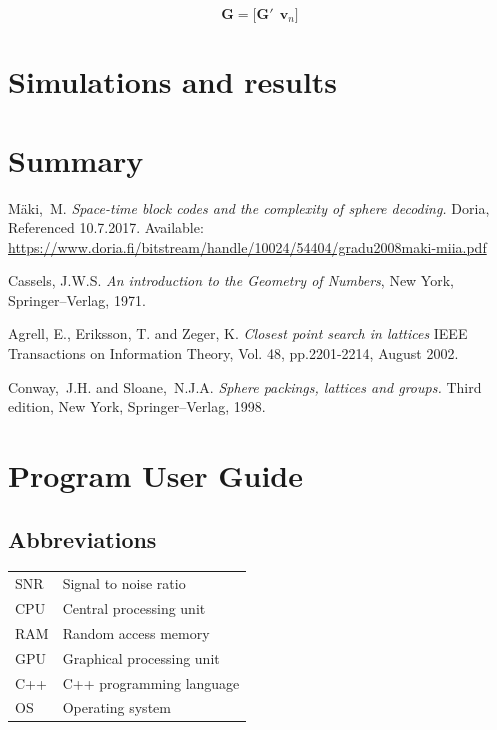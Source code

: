 \documentclass[english,12pt,a4paper,pdftex,sci,utf8]{aaltothesis}
\begin{document}
\begin{equation}
\mathbf{G} = \big[\mathbf{G}' \ \ \mathbf{v}_n \big]
\label{eq:gen}
\end{equation}

\clearpage

\section{Simulations and results}
 
\clearpage

\section{Summary}


\clearpage

{}
\begin{thebibliography}{99}

 Mäki,\ M. \textit{Space-time block codes and the complexity of sphere decoding.} Doria, Referenced 10.7.2017. Available:
  \url{https://www.doria.fi/bitstream/handle/10024/54404/gradu2008maki-miia.pdf}
  
  
 Cassels, J.W.S. \textit{An introduction to the Geometry of Numbers}, New York, Springer--Verlag, 1971.

 Agrell, E., Eriksson, T. and Zeger, K. \textit{Closest point search in lattices} IEEE Transactions on Information Theory, Vol. 48, pp.2201-2214,
August 2002.

 Conway,\ J.H. and Sloane,\ N.J.A. \textit{Sphere packings, lattices and groups.} Third edition, New York, Springer--Verlag, 1998.


\end{thebibliography}

\clearpage

\thesisappendix

\section{Program User Guide}

\subsection{Abbreviations}
\begin{tabular}{ll}
SNR & Signal to noise ratio \\
CPU & Central processing unit \\
RAM & Random access memory \\
GPU & Graphical processing unit \\
C++ & C++ programming language \\
OS & Operating system \\
\end{tabular}
\end{document}
